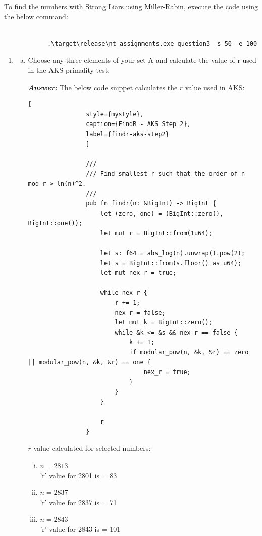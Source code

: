 \documentclass[11pt,a4paper]{article}
\begin{document}
\begin{enumerate}[1.]
\begin{enumerate}[3.]
		\bigbreak
		To find the numbers with Strong Liars using Miller-Rabin, execute the code using the below command:
		\begin{lstlisting}[style=DOS, caption=GCD Test Execution]
			
			.\target\release\nt-assignments.exe question3 -s 50 -e 100
		\end{lstlisting}
	\end{enumerate}
	\begin{enumerate}[4.]
		\item
		\begin{enumerate}[(a)]
			\item Choose any three elements of your set A and calculate the value of r used in the AKS primality test;
			\begin{flushleft}
			\textbf{\textit{Answer:}} The below code snippet calculates the $r$ value used in AKS:
			
			\begin{lstlisting}[
				style={mystyle},
				caption={FindR - AKS Step 2},
				label={findr-aks-step2}
				]
				
				///
				/// Find smallest r such that the order of n mod r > ln(n)^2.
				///
				pub fn findr(n: &BigInt) -> BigInt {
					let (zero, one) = (BigInt::zero(), BigInt::one());
					let mut r = BigInt::from(1u64);
					
					let s: f64 = abs_log(n).unwrap().pow(2);
					let s = BigInt::from(s.floor() as u64);
					let mut nex_r = true;
					
					while nex_r {
						r += 1;
						nex_r = false;
						let mut k = BigInt::zero();
						while &k <= &s && nex_r == false {
							k += 1;
							if modular_pow(n, &k, &r) == zero || modular_pow(n, &k, &r) == one {
								nex_r = true;
							}
						}
					}
					
					r
				}
			\end{lstlisting}
			
			\bigbreak
			$r$ value calculated for selected numbers:
			\medskip
			\begin{enumerate}[i.]
				\item $n = 2813$ \\
				'r' value for 2801 is = 83
				\item $n = 2837$ \\
				'r' value for 2837 is = 71
				\item $n = 2843$ \\
				'r' value for 2843 is = 101
			\end{enumerate}
			\end{flushleft}
		

\end{enumerate}
\end{enumerate}
\end{enumerate}
\end{document}

